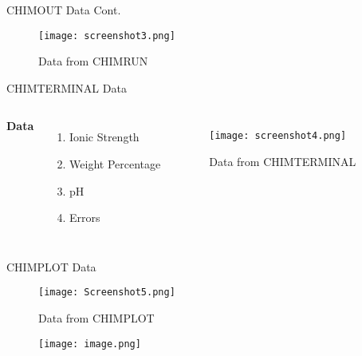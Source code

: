 \documentclass[aspectratio=169,xcolor=dvipsnames]{beamer}
\begin{document}

\begin{frame}{CHIMOUT Data Cont.}
    \begin{figure}
        \centering
        \texttt{[image: screenshot3.png]}
        \caption{Data from CHIMRUN}
        \label{fig:enter-label}
    \end{figure}
\end{frame}


\begin{frame}{CHIMTERMINAL Data}
    \begin{columns}[c] %

        \textbf{Data}
        \begin{enumerate}
            \item Ionic Strength
            \item Weight Percentage
            \item pH
            \item Errors
        \end{enumerate}

        \begin{figure}
            \centering
            \texttt{[image: screenshot4.png]}
            \caption{Data from CHIMTERMINAL}
            \label{fig:enter-label}
        \end{figure}
        
    \end{columns}
\end{frame}


\begin{frame}{CHIMPLOT Data}
    \begin{figure}
        \centering
        \texttt{[image: Screenshot5.png]}
        \caption{Data from CHIMPLOT}
        \label{fig:enter-label}
    \end{figure}
\end{frame}


\begin{frame}{}
    \begin{figure}
        \centering
        \texttt{[image: image.png]}
        \label{fig:enter-label}
    \end{figure}
\end{frame}
\end{document}
